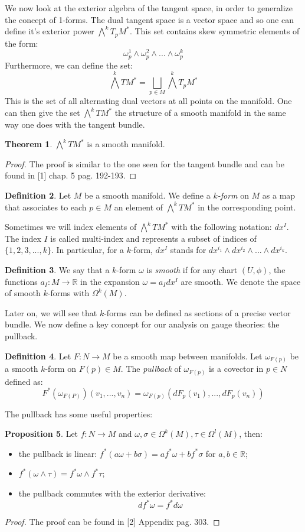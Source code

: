 \documentclass[12pt,a4paper]{report}
\theoremstyle{definition}
\newtheorem{Def}{Definition}[chapter]
\theoremstyle{Theorem}
\newtheorem{Theo}[Def]{Theorem}
\newtheorem{Prop}[Def]{Proposition}
\theoremstyle{definition}
\theoremstyle{definition}
\begin{document}
	We now look at the exterior algebra of the tangent space, in order to generalize the concept of 1-forms. The dual tangent space is a vector space and so one can define it's exterior power $\bigwedge^k T_pM^*$. This set contains skew symmetric elements of the form:
	$$\omega^1_p\wedge \omega^2_p\wedge...\wedge \omega^k_p$$
	Furthermore, we can define the set:
	$$\bigwedge^k TM^*=\bigsqcup_{p\in M}\bigwedge^k T_pM^*$$
	This is the set of all alternating dual vectors at all points on the manifold. One can then give the set $\bigwedge^k TM^*$ the structure  of a smooth manifold in the same way one does with the tangent bundle.
	\begin{Theo}
		$\bigwedge^kTM^*$ is a smooth manifold.
	\end{Theo}
	\begin{proof}
		The proof is similar to the one seen for the tangent bundle and can be found in [1] chap. 5 pag. 192-193.
	\end{proof}
	\begin{Def}
		Let $M$ be a smooth manifold. We define a \textit{$k$-form} on $M$ as a map that associates to each $p\in M$ an element of $\bigwedge^k TM^*$ in the corresponding point. 
	\end{Def}
	Sometimes we will index elements of $\bigwedge^k TM^*$ with the following notation: $dx^I$. The index $I$ is called multi-index and represents a subset of indices of $\{1,2,3,...,k\}$. In particular, for a $k$-form, $dx^I$ stands for $dx^{i_1}\wedge dx^{i_2}\wedge...\wedge dx^{i_k}$.
	\begin{Def}
		We say that a $k$-form $\omega$ is \textit{smooth} if for any chart $(U,\phi)$, the functions $a_I:M\rightarrow \mathbb{R}$ in the expansion $\omega=a_Idx^I$ are smooth.
		We denote the space of smooth $k$-forms with $\Omega^k(M)$. 
	\end{Def}
	Later on, we will see that $k$-forms can be defined as sections of a precise vector bundle. We now define a key concept for our analysis on gauge theories: the pullback.
	\begin{Def}
		Let $F:N\rightarrow M$ be a smooth map between manifolds.
		Let $\omega_{F(p)}$ be a smooth $k$-form on $F(p)\in M$. The \textit{pullback} of $\omega_{F(p)}$ is a covector in $p\in N$ defined as:
		$$F^*(\omega_{F(P)})(v_1,...,v_n)=\omega_{F(p)}(dF_p(v_1),...,dF_p(v_n))$$ 
	\end{Def}
	The pullback has some useful properties:
	\begin{Prop}
		Let $f:N\rightarrow M$ and $\omega,\sigma\in \Omega^k(M),\tau\in\Omega^l(M)$, then:
		\begin{itemize}
			\item the pullback is linear: $f^*(a\omega+b\sigma)=af^*\omega+bf^*\sigma$ for $a,b\in \mathbb{R}$;
			\item $f^*(\omega\wedge \tau)=f^*\omega\wedge f^*\tau$;
			\item the pullback commutes with the exterior derivative:
			$$df^*\omega=f^*d\omega$$
		\end{itemize}
	\end{Prop}
	\begin{proof}
		The proof can be found in [2] Appendix pag. 303.
	\end{proof}
\end{document}

